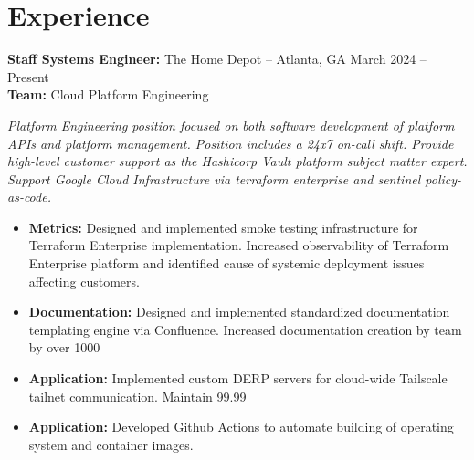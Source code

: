 \documentclass[11pt]{article}       %
\begin{document}
\section*{Experience}
\begin{description}
\item \textbf{Staff Systems Engineer:} {The Home Depot} -- Atlanta, GA \hfill March 2024 -- Present \\
\textbf{Team:} Cloud Platform Engineering \\
\end{description}
\vspace{4pt}
\textit{Platform Engineering position focused on both software development of platform APIs and platform management. Position includes a 24x7 on-call shift. Provide high-level customer support as the Hashicorp Vault platform subject matter expert. Support Google Cloud Infrastructure via terraform enterprise and sentinel policy-as-code.} \\
\vspace{-6.5pt}
\begin{itemize}
  \item \textbf{Metrics:} Designed and implemented smoke testing infrastructure for Terraform Enterprise implementation. Increased observability of Terraform Enterprise platform and identified cause of systemic deployment issues affecting customers.
  \item \textbf{Documentation:} Designed and implemented standardized documentation templating engine via Confluence. Increased documentation creation by team by over 1000%
  \item \textbf{Application:} Implemented custom DERP servers for cloud-wide Tailscale tailnet communication. Maintain 99.99%
  \item \textbf{Application:} Developed Github Actions to automate building of operating system and container images.
\end{itemize}
\end{document}
